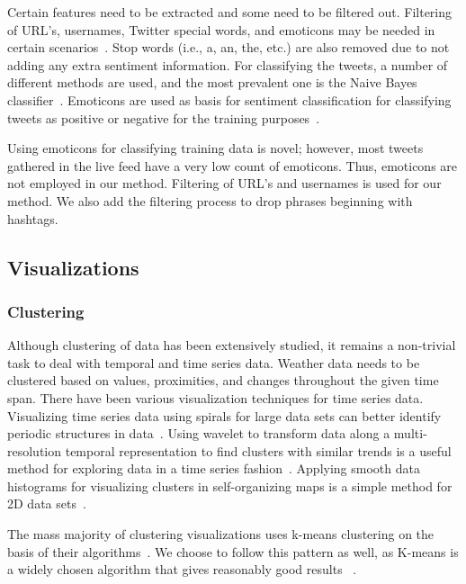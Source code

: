 Certain features need to be extracted and some need to be filtered out. Filtering of URL's, usernames, Twitter special words, and emoticons may be needed in certain scenarios~\cite{pak2010twitter}. Stop words (i.e., a, an, the, etc.) are also removed due to not adding any extra sentiment information. For classifying the tweets, a number of different methods are used, and the most prevalent one is the Naive Bayes classifier~\cite{pangthumbs}. Emoticons are used as basis for sentiment classification for classifying tweets as positive or negative for the training purposes~\cite{keller2005warm,agarwal2011sentiment}.

Using emoticons for classifying training data is novel; however, most tweets gathered in the live feed have a very low count of emoticons. Thus, emoticons are not employed in our method. Filtering of URL's and usernames is used for our method. We also add the filtering process to drop phrases beginning with hashtags.

\subsection{Visualizations}

\subsubsection{Clustering}

Although clustering of data has been extensively studied, it remains a non-trivial task to deal with temporal and time series data. Weather data needs to be clustered based on values, proximities, and changes throughout the given time span. There have been various visualization techniques for time series data. Visualizing time series data using spirals for large data sets can better identify periodic structures in data~\cite{weber2001visualizing}. Using wavelet to transform data along a multi-resolution temporal representation to find clusters with similar trends is a useful method for exploring data in a time series fashion~\cite{woodring2009multiscale}. Applying smooth data histograms for visualizing clusters in self-organizing maps is a simple method for 2D data sets~\cite{pampalk2002using}.

The mass majority of clustering visualizations uses k-means clustering on the basis of their algorithms~\cite{weber2001visualizing,woodring2009multiscale,pampalk2002using}. We choose to follow this pattern as well, as K-means is a widely chosen algorithm that gives reasonably good results ~\cite{weber2001visualizing,jain2010data}.

